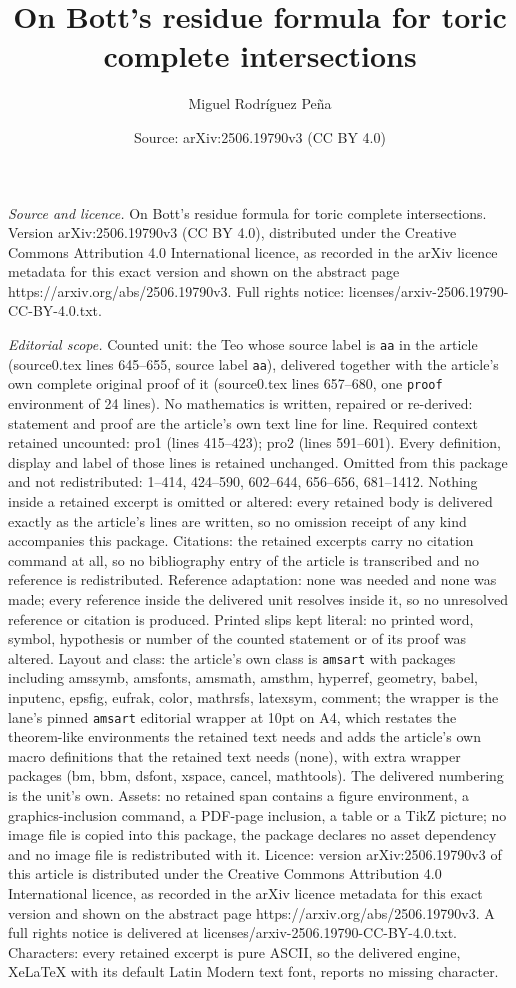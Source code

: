 \documentclass[10pt,a4paper]{amsart}
\title[On Bott's residue formula for toric complete intersections]{On Bott's residue formula for toric complete intersections}
\author{Miguel Rodr\'iguez Pe\~na}
\date{Source: arXiv:2506.19790v3 (CC BY 4.0)}
\begin{document}
\maketitle

\noindent\emph{Source and licence.} On Bott's residue formula for toric complete intersections. Version arXiv:2506.19790v3 (CC BY 4.0), distributed under the Creative Commons Attribution 4.0 International licence, as recorded in the arXiv licence metadata for this exact version and shown on the abstract page https://arxiv.org/abs/2506.19790v3. Full rights notice: licenses/arxiv-2506.19790-CC-BY-4.0.txt.\par\smallskip

\noindent\textit{Editorial scope.} Counted unit: the Teo whose source label is \texttt{aa} in the article (source0.tex lines 645--655, source label \texttt{aa}), delivered together with the article's own complete original proof of it (source0.tex lines 657--680, one \texttt{proof} environment of 24 lines). No mathematics is written, repaired or re-derived: statement and proof are the article's own text line for line. Required context retained uncounted: pro1 (lines 415--423); pro2 (lines 591--601). Every definition, display and label of those lines is retained unchanged. Omitted from this package and not redistributed: 1--414, 424--590, 602--644, 656--656, 681--1412. Nothing inside a retained excerpt is omitted or altered: every retained body is delivered exactly as the article's lines are written, so no omission receipt of any kind accompanies this package. Citations: the retained excerpts carry no citation command at all, so no bibliography entry of the article is transcribed and no reference is redistributed. Reference adaptation: none was needed and none was made; every reference inside the delivered unit resolves inside it, so no unresolved reference or citation is produced. Printed slips kept literal: no printed word, symbol, hypothesis or number of the counted statement or of its proof was altered. Layout and class: the article's own class is \texttt{amsart} with packages including amssymb, amsfonts, amsmath, amsthm, hyperref, geometry, babel, inputenc, epsfig, eufrak, color, mathrsfs, latexsym, comment; the wrapper is the lane's pinned \texttt{amsart} editorial wrapper at 10pt on A4, which restates the theorem-like environments the retained text needs and adds the article's own macro definitions that the retained text needs (none), with extra wrapper packages (bm, bbm, dsfont, xspace, cancel, mathtools). The delivered numbering is the unit's own. Assets: no retained span contains a figure environment, a graphics-inclusion command, a PDF-page inclusion, a table or a TikZ picture; no image file is copied into this package, the package declares no asset dependency and no image file is redistributed with it. Licence: version arXiv:2506.19790v3 of this article is distributed under the Creative Commons Attribution 4.0 International licence, as recorded in the arXiv licence metadata for this exact version and shown on the abstract page https://arxiv.org/abs/2506.19790v3. A full rights notice is delivered at licenses/arxiv-2506.19790-CC-BY-4.0.txt. Characters: every retained excerpt is pure ASCII, so the delivered engine, XeLaTeX with its default Latin Modern text font, reports no missing character.
\end{document}
